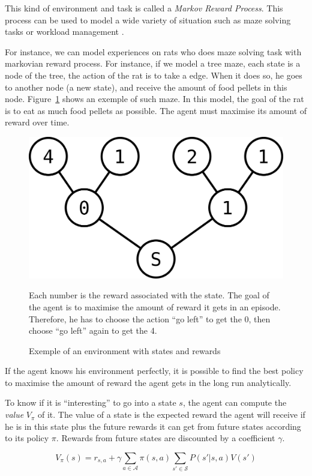 \documentclass[]{article}
\begin{document}
This kind of environment and task is called a \emph{Markov Reward Process}. This process can be used to model a wide variety of situation such as maze solving tasks or workload management \parencite{sutton_reinforcement_1998,vanseijen_deeper_2015}.

For instance, we can model experiences on rats who does maze solving task with markovian reward process. For instance, if we model a tree maze, each state is a node of the tree, the action of the rat is to take a edge. When it does so, he goes to another node (a new state), and receive the amount of food pellets in this node. Figure~\ref{fig:mdp_tree} shows an exemple of such maze. In this model, the goal of the rat is to eat as much food pellets as possible. The agent must maximise its amount of reward over time.

\begin{figure}[htpb]
  {\centering
  \includegraphics[width=0.4\linewidth]{images/mdp_tree.png}
  \caption{Exemple of an environment with states and rewards\label{fig:mdp_tree}}}
  \small
  Each number is the reward associated with the state. The goal of the agent is to maximise the amount of reward it gets in an episode. Therefore, he has to choose the action ``go left'' to get the 0, then choose ``go left'' again to get the 4.
\end{figure}

If the agent knows his environment perfectly, it is possible to find the best policy to maximise the amount of reward the agent gets in the long run analytically.

To know if it is ``interesting'' to go into a state \(s\), the agent can compute the \emph{value} \(V_\pi\) of it. The value of a state is the expected reward the agent will receive if he is in this state plus the future rewards it can get from future states according to its policy \(\pi\). Rewards from future states are discounted by a coefficient \(\gamma\).

\begin{equation}
  V_\pi(s) = r_{s, a} + \gamma \sum_{a\in\mathcal{A}} \pi(s,a)\sum_{s'\in\mathcal{S}} P(s'|s, a) V(s')
\end{equation}
\end{document}
